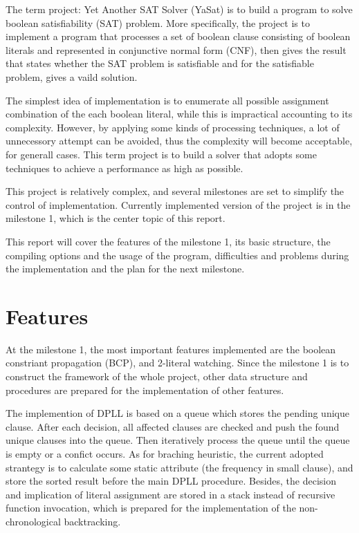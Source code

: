 \documentclass[a4paper, 11.5pt]{article}
\begin{document}
  \begin{multicols}{2}

  The term project: Yet Another SAT Solver (YaSat) is to build a program to solve boolean satisfiability (SAT) problem. More specifically, the project is to implement a program 
  that processes a set of boolean clause consisting of boolean literals and represented in 
  conjunctive normal form (CNF), then gives the result that states whether the SAT problem is
  satisfiable and for the satisfiable problem, gives a vaild solution. 

  The simplest idea of implementation is to enumerate all possible assignment combination 
  of the each boolean literal, while this is impractical accounting to its complexity. 
  However, by applying some kinds of processing techniques, a lot of unnecessory attempt can be 
  avoided, thus the complexity will become acceptable, for generall cases. This term project is 
  to build a solver that adopts some techniques to achieve a performance as high as possible.

  This project is relatively complex, and several milestones are set to simplify the control of 
  implementation. Currently implemented version of the project is in the milestone 1, which is the 
  center topic of this report. 

  This report will cover the features of the milestone 1, its basic structure, the compiling options and the usage of the program, difficulties and problems during the implementation and the plan for the next milestone.

  \section{Features}
    At the milestone 1, the most important features implemented are the boolean constriant 
    propagation (BCP), and 2-literal watching. Since the milestone 1 is to construct the
    framework of the whole project, other data structure and procedures are prepared for the
    implementation of other features.

    The implemention of DPLL is based on a queue which 
    stores the pending unique clause. After each decision, all affected clauses
    are checked and push the found unique clauses into the queue. Then 
    iteratively process the queue until the queue is empty or a confict 
    occurs. As for braching heuristic, the current adopted strantegy 
    is to calculate some static attribute (the frequency in small clause), and 
    store the sorted result before the main DPLL procedure. Besides, the decision
    and implication of literal assignment are stored in a stack instead of 
    recursive function invocation, which is prepared for the implementation of 
    the non-chronological backtracking.




\end{multicols}
\end{document}
